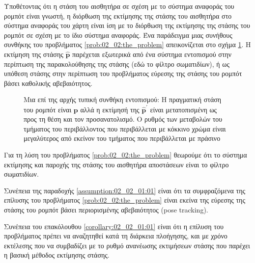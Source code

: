 Υποθέτοντας ότι η στάση του αισθητήρα σε σχέση με το σύστημα αναφοράς του
ρομπότ είναι γνωστή, η διόρθωση της εκτίμησης της στάσης του αισθητήρα στο
σύστημα αναφοράς του χάρτη είναι ίση με το διόρθωση της εκτίμησης της στάσης
του ρομπότ σε σχέση με το ίδιο σύστημα αναφοράς. Ένα παράδειγμα μιας συνήθους
συνθήκης του προβλήματος \ref{prob:02_02:the_problem} απεικονίζεται στο σχήμα
\ref{fig:02_02:the_problem}. Η εκτίμηση της στάσης $\hat{\bm{p}}$
παρέχεται εξωτερικά από ένα σύστημα εντοπισμού στην περίπτωση της
παρακολούθησης της στάσης (εδώ το φίλτρο σωματιδίων), ή ως υπόθεση στάσης στην
περίπτωση του προβλήματος εύρεσης της στάσης του ρομπότ βάσει καθολικής
αβεβαιότητος.

\begin{figure}[]\centering
  
  \caption{\small Μια επί της αρχής τυπική συνθήκη εντοπισμού: Η πραγματική
           στάση του ρομπότ είναι $\bm{p}$ αλλά η εκτίμησή της
           $\hat{\bm{p}}^\prime$ είναι μετατοπισμένη ως προς τη θέση και τον
           προσανατολισμό. Ο ρυθμός των μεταβολών του τμήματος του
           περιβάλλοντος που περιβάλλεται με κόκκινο χρώμα είναι μεγαλύτερος
           από εκείνον του τμήματος που περιβάλλεται με πράσινο}
  \label{fig:02_02:the_problem}
\end{figure}


\begin{bw_box}
  \begin{assumption}
    \label{assumption:02_02_01:01}
    Για τη λύση του προβλήματος \ref{prob:02_02:the_problem} θεωρούμε ότι το
    σύστημα εκτίμησης και παροχής της στάσης του αισθητήρα αποστάσεων είναι το
    φίλτρο σωματιδίων.
  \end{assumption}
\end{bw_box}

\begin{bw_box}
  \begin{corollary}
    \label{corollary:02_02_01:01}
    Συνέπεια της παραδοχής \ref{assumption:02_02_01:01} είναι ότι τα
    συμφραζόμενα της επίλυσης του προβλήματος \ref{prob:02_02:the_problem}
    είναι εκείνα της εύρεσης της στάσης του ρομπότ βάσει περιορισμένης
    αβεβαιότητος (pose tracking).
  \end{corollary}
\end{bw_box}

\begin{bw_box}
  \begin{corollary}
    \label{corollary:02_02_01:02}
    Συνέπεια του επακόλουθου \ref{corollary:02_02_01:01} είναι ότι η επίλυση
    του προβλήματος πρέπει να αναζητηθεί κατά τη διάρκεια πλοήγησης, και με
    χρόνο εκτέλεσης που να συμβαδίζει με το ρυθμό ανανέωσης εκτιμήσεων στάσης
    που παρέχει η βασική μέθοδος εκτίμησης στάσης.
  \end{corollary}
\end{bw_box}

